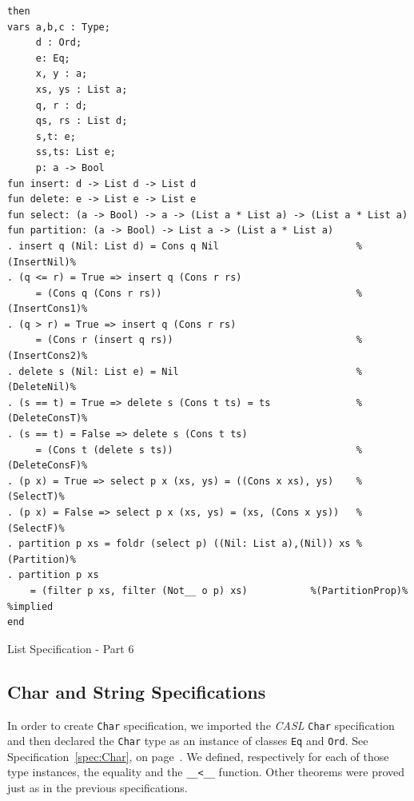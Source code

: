 \documentclass[12pt,twoside]{article}
\numberwithin{spec}{subsection}
\numberwithin{proof}{subsection}
\numberwithin{figure}{subsection}
\numberwithin{code}{subsection}
\newcommand{\citeSpec}[1]{Specification~\ref{#1}, on page~\pageref{#1}}
\begin{document}
\addtocounter{spec}{-1}
\begin{spec}
\begin{verbatim}
then
vars a,b,c : Type;
     d : Ord;
     e: Eq;
     x, y : a;
     xs, ys : List a;
     q, r : d;
     qs, rs : List d;
     s,t: e;
     ss,ts: List e;
     p: a -> Bool
fun insert: d -> List d -> List d
fun delete: e -> List e -> List e
fun select: (a -> Bool) -> a -> (List a * List a) -> (List a * List a)
fun partition: (a -> Bool) -> List a -> (List a * List a)
. insert q (Nil: List d) = Cons q Nil                        %(InsertNil)%
. (q <= r) = True => insert q (Cons r rs) 
     = (Cons q (Cons r rs))                                  %(InsertCons1)%
. (q > r) = True => insert q (Cons r rs) 
     = (Cons r (insert q rs))                                %(InsertCons2)%
. delete s (Nil: List e) = Nil                               %(DeleteNil)%
. (s == t) = True => delete s (Cons t ts) = ts               %(DeleteConsT)%
. (s == t) = False => delete s (Cons t ts) 
     = (Cons t (delete s ts))                                %(DeleteConsF)%
. (p x) = True => select p x (xs, ys) = ((Cons x xs), ys)    %(SelectT)%
. (p x) = False => select p x (xs, ys) = (xs, (Cons x ys))   %(SelectF)%
. partition p xs = foldr (select p) ((Nil: List a),(Nil)) xs %(Partition)%
. partition p xs 
    = (filter p xs, filter (Not__ o p) xs)           %(PartitionProp)% %implied
end
\end{verbatim}
\caption{List Specification - Part 6}
\end{spec}

\clearpage

\subsection{Char and String Specifications}
In order to create \verb.Char. specification, we imported the \textit{CASL} \verb.Char. specification and then declared the \verb.Char. type as an instance of classes \verb.Eq. and \verb.Ord.. See \citeSpec{spec:Char}. We defined, respectively for each of those type instances, the equality and the \verb.__<__. function. Other theorems were proved just as in the previous specifications.
\end{document}
